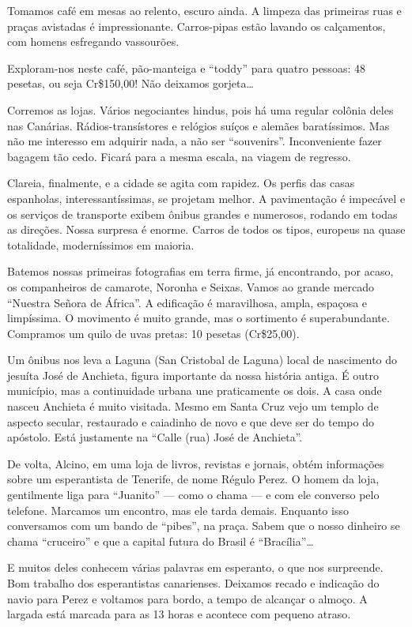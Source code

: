Tomamos café em mesas ao relento, escuro ainda. A limpeza das primeiras ruas e praças avistadas é impressionante. Carros-pipas estão lavando os calçamentos, com homens esfregando vassourões.

Exploram-nos neste café, pão-manteiga e ``toddy'' para quatro pessoas: 48 pesetas, ou seja Cr\$150,00! Não deixamos gorjeta\ldots

Corremos as lojas. Vários negociantes hindus, pois há uma regular colônia deles nas Canárias. Rádios-transístores e relógios suíços e alemães baratíssimos. Mas não me interesso em adquirir nada, a não ser ``souvenirs''. Inconveniente fazer bagagem tão cedo. Ficará para a mesma escala, na viagem de regresso.

Clareia, finalmente, e a cidade se agita com rapidez. Os perfis das casas espanholas, interessantíssimas, se projetam melhor. A pavimentação é impecável e os serviços de transporte exibem ônibus grandes e numerosos, rodando em todas as direções. Nossa surpresa é enorme. Carros de todos os tipos, europeus na quase totalidade, moderníssimos em maioria.

Batemos nossas primeiras fotografias em terra firme, já encontrando, por acaso, os companheiros de camarote, Noronha e Seixas. Vamos ao grande mercado ``Nuestra Señora de África''. A edificação é maravilhosa, ampla, espaçosa e limpíssima. O movimento é muito grande, mas o sortimento é superabundante. Compramos um quilo de uvas pretas: 10 pesetas (Cr\$25,00).

Um ônibus nos leva a Laguna (San Cristobal de Laguna) local de nascimento do jesuíta José de Anchieta, figura importante da nossa história antiga. É outro município, mas a continuidade urbana une praticamente os dois. A casa onde nasceu Anchieta é muito visitada. Mesmo em Santa Cruz vejo um templo de aspecto secular, restaurado e caiadinho de novo e que deve ser do tempo do apóstolo. Está justamente na ``Calle (rua) José de Anchieta''.

De volta, Alcino, em uma loja de livros, revistas e jornais, obtém informações sobre um esperantista de Tenerife, de nome Régulo Perez. O homem da loja, gentilmente liga para ``Juanito'' --- como o chama --- e com ele converso pelo telefone. Marcamos um encontro, mas ele tarda demais. Enquanto isso conversamos com um bando de ``pibes'', na praça. Sabem que o nosso dinheiro se chama ``cruceiro'' e que a capital futura do Brasil é ``Bracília''\ldots

E muitos deles conhecem várias palavras em esperanto, o que nos surpreende. Bom trabalho dos esperantistas canarienses. Deixamos recado e indicação do navio para Perez e voltamos para bordo, a tempo de alcançar o almoço. A largada está marcada para as 13 horas e acontece com pequeno atraso.


